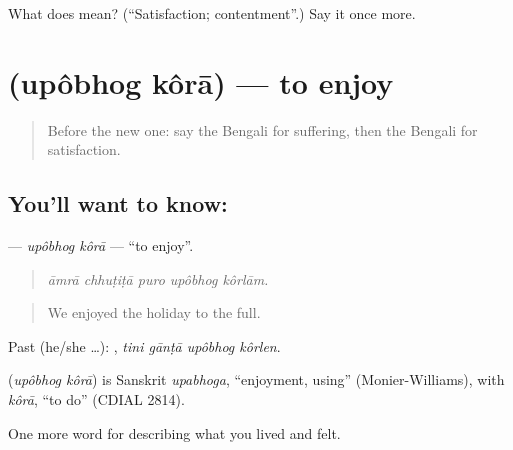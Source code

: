 \begin{tcolorbox}[breakable,colback=teal!4,colframe=teal!35!black,title={Before you move on}]
What does  mean? (\textquotedblleft{}Satisfaction; contentment\textquotedblright{}.) Say it once more.
\end{tcolorbox}
\section[\texorpdfstring{\bn{উপভোগ} \bn{করা} (upôbhog kôrā)}{উপভোগ করা (upôbhog kôrā)}]{  (upôbhog kôrā) — to enjoy}

\label{lesson:BN-C439-upobhog-kora}



\begin{quote}
Before the new one: say the Bengali for suffering, then the Bengali for satisfaction.
\end{quote}

\subsection*{You'll want to know:  }
\textbf{ } — \emph{upôbhog kôrā} — \textquotedblleft{}to enjoy\textquotedblright{}.

\begin{quote}
    
\end{quote}

\begin{quote}
\emph{āmrā chhuṭiṭā puro upôbhog kôrlām.}
\end{quote}

\begin{quote}
We enjoyed the holiday to the full.
\end{quote}

Past (he/she …):    , \emph{tini gānṭā upôbhog kôrlen}.

\begin{cousinweb}
\textbf{ } (\emph{upôbhog kôrā}) is Sanskrit \emph{upabhoga}, \textquotedblleft{}enjoyment, using\textquotedblright{} (Monier-Williams), with \emph{kôrā}, \textquotedblleft{}to do\textquotedblright{} (CDIAL 2814).
\end{cousinweb}

\begin{grammarlens}[title={What you've built}]
One more word for describing what you lived and felt.
\end{grammarlens}

